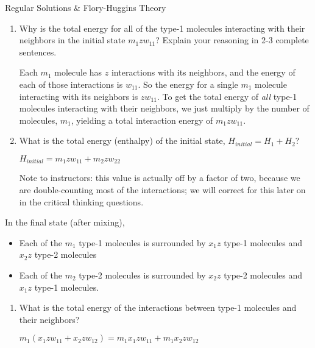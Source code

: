 \begin{activity}{Regular Solutions \& Flory-Huggins Theory}
\begin{ctqs}
		\begin{enumerate}
			\item Why is the total energy for all of the type-1 molecules interacting with their neighbors in the initial state $m_1 z w_{11}$?  Explain your reasoning in 2-3 complete sentences.
			
				\begin{solution}[2.5in]
				
					Each $m_1$ molecule has $z$ interactions with its neighbors, and the energy of each of those interactions is $w_{11}$.  So the energy for a single $m_1$ molecule interacting with its neighbors is $zw_{11}$.  To get the total energy of \emph{all} type-1 molecules interacting with their neighbors, we just multiply by the number of molecules, $m_1$, yielding a total interaction energy of $m_1 z w_{11}$.
				
				\end{solution}
				
			\item What is the total energy (enthalpy) of the initial state, $H_{initial} = H_1 + H_2$?
		
			\begin{solution}[1.25in]
				$H_{initial} = m_1 z w_{11} + m_2 z w_{22}$
			
				Note to instructors: this value is actually off by a factor of two, because we are double-counting most of the interactions; we will correct for this later on in the critical thinking questions. 
			\end{solution}
			
		\end{enumerate}

	\question In the final state (after mixing),
	
		\begin{itemize}[topsep=3pt,itemsep=0pt]
			\item Each of the $m_1$ type-1 molecules is surrounded by $x_1 z$ type-1 molecules and $x_2 z$ type-2 molecules
			\item Each of the $m_2$ type-2 molecules is surrounded by $x_2 z$ type-2 molecules and $x_1 z$ type-1 molecules.
		\end{itemize}
		
		\begin{enumerate}
			\item What is the total energy of the interactions between type-1 molecules and their neighbors?
			
				\begin{solution}[1.25in]
					$m_1(x_1 z w_{11} + x_2 z w_{12}) = m_1 x_1 z w_{11} + m_1 x_2 z w_{12}$
				\end{solution}
				

\end{enumerate}
\end{ctqs}
\end{activity}
